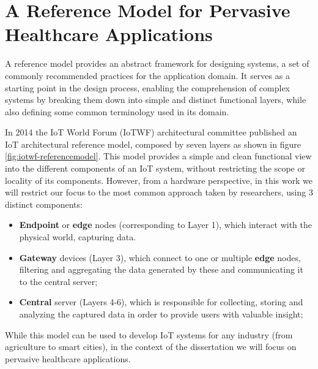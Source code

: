 
\section{A Reference Model for Pervasive Healthcare Applications}


A reference model provides an abstract framework for designing systems, a set of commonly recommended practices for the application domain. It serves as a starting point in the design process, enabling the comprehension of complex systems by breaking them down into simple and distinct functional layers, while also defining some common terminology used in its domain. \bigskip

In 2014 the \acs{IoT} World Forum (IoTWF) architectural committee published an \acs{IoT} architectural reference model, composed by seven layers as shown in figure \ref{fig:iotwf-referencemodel}. This model provides a simple and clean functional view into the different components of an \acs{IoT} system, without restricting the scope or locality of its components. However, from a hardware perspective, in this work we will restrict our focus to the most common approach taken by researchers, using 3 distinct components: 

\begin{itemize}
    \item \textbf{Endpoint} or \textbf{edge} nodes (corresponding to Layer 1), which interact with the physical world, capturing data.
    \item \textbf{Gateway} devices (Layer 3), which connect to one or multiple \textbf{edge} nodes, filtering and aggregating the data generated by these and communicating it to the central server; 
    \item \textbf{Central} server (Layers 4-6), which is responsible for collecting, storing and analyzing the captured data in order to provide users with valuable insight;
\end{itemize}

While this model can be used to develop IoT systems for any industry (from agriculture to smart cities), in the context of the dissertation we will focus on pervasive healthcare applications. \bigskip


